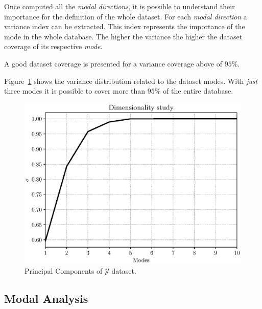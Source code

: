 Once computed all the \textit{modal directions}, it is possible to understand their importance for the 
definition of the whole dataset. For each \textit{modal direction} a variance index can be extracted.
This index represents the importance of the mode in the whole database. 
The higher the variance the higher the dataset coverage of its respective \textit{mode}.

A good dataset coverage is presented for a variance coverage above of $95\%$. 

Figure~\ref{fig:PCA} shows the variance distribution related to the dataset modes. 
With \textit{just} three modes it is possible to cover more than $95\%$ of the entire database.

\begin{figure}[H]
    \centering
    \includegraphics[scale=0.7]{./images/PCAmodes.eps}
    \caption{Principal Components of $\mathcal{Y}$ dataset.}
    \label{fig:PCA}
\end{figure}

\subsection{Modal Analysis}


